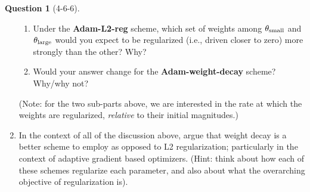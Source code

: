 \documentclass[12pt]{article}
\newif\ifsolution
\theoremstyle{definition}
\newtheorem{exercise}{Question}%
\newtheorem{answer}{Answer} %
\newcommand{\Answer}[1]{
\ifsolution\color{answer}\begin{answer}#1\end{answer}\fi
}
\newif\ifsolution
\begin{document}
\begin{exercise}[4-6-6]
\begin{enumerate}[label=\arabic{exercise}.\arabic*]
        \begin{enumerate}
            \item Under the \textbf{Adam-L2-reg} scheme, which set of weights among $\mathbf{\theta_{\textnormal{small}}}$ and $\mathbf{\theta_{\textnormal{large}}}$ would you expect to be regularized (i.e., driven closer to zero) more strongly than the other? Why?
            \item Would your answer change for the \textbf{Adam-weight-decay} scheme? Why/why not?
        \end{enumerate}
        (Note: for the two sub-parts above, we are interested in the rate at which the weights are regularized, \emph{relative} to their initial magnitudes.)
        \item In the context of all of the discussion above, argue that weight decay is a better scheme to employ as opposed to L2 regularization; particularly in the context of adaptive gradient based optimizers. (Hint: think about how each of these schemes regularize each parameter, and also about what the overarching objective of regularization is).
    \end{enumerate}

    \Answer{
    }
\end{exercise}
\end{document}
